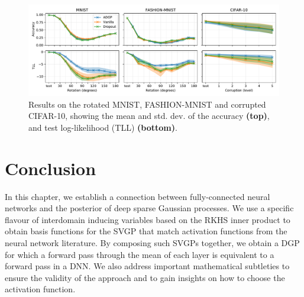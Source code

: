 \begin{figure}[t]
    \centering   
    \includegraphics[width=\textwidth]{image_classification}
    \caption{Results on the rotated MNIST, FASHION-MNIST and corrupted CIFAR-10, showing the mean and std. dev. of the accuracy \textbf{(top)}, and test log-likelihood (TLL) \textbf{(bottom)}.}
    \label{fig:image-classification}
\end{figure}


\section{Conclusion}

In this chapter, we establish a connection between fully-connected neural networks and the posterior of deep sparse Gaussian processes. We use a specific flavour of interdomain inducing variables based on the RKHS inner product to obtain basis functions for the SVGP that match activation functions from the neural network literature. By composing such SVGPs together, we obtain a DGP for which a forward pass through the mean of each layer is equivalent to a forward pass in a DNN. We also address important mathematical subtleties to ensure the validity of the approach and to gain insights on how to choose the activation function. 
